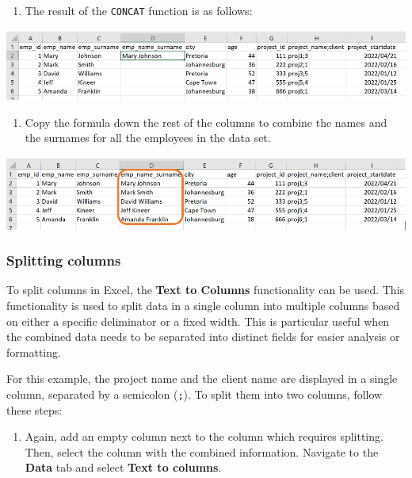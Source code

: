 \documentclass[
]{book}
\providecommand{\tightlist}{%
  \setlength{\itemsep}{0pt}\setlength{\parskip}{0pt}}
\begin{document}
\begin{enumerate}
\def\labelenumi{\arabic{enumi}.}
\setcounter{enumi}{2}
\tightlist
\item
  The result of the \texttt{CONCAT} function is as follows:
\end{enumerate}

\begin{center}\includegraphics[width=0.8\linewidth]{Figures/combine_4} \end{center}

\begin{enumerate}
\def\labelenumi{\arabic{enumi}.}
\setcounter{enumi}{3}
\tightlist
\item
  Copy the formula down the rest of the columns to combine the names and the surnames for all the employees in the data set.
\end{enumerate}

\begin{center}\includegraphics[width=0.8\linewidth]{Figures/combine_5} \end{center}

\subsubsection*{Splitting columns}\label{splitting-columns}

To split columns in Excel, the \textbf{Text to Columns} functionality can be used. This functionality is used to split data in a single column into multiple columns based on either a specific deliminator or a fixed width. This is particular useful when the combined data needs to be separated into distinct fields for easier analysis or formatting.

For this example, the project name and the client name are displayed in a single column, separated by a semicolon (\texttt{;}). To split them into two columns, follow these steps:

\begin{enumerate}
\def\labelenumi{\arabic{enumi}.}
\tightlist
\item
  Again, add an empty column next to the column which requires splitting. Then, select the column with the combined information. Navigate to the \textbf{Data} tab and select \textbf{Text to columns}.
\end{enumerate}
\end{document}
